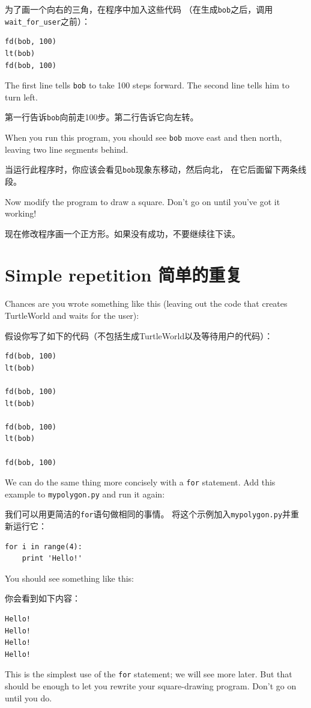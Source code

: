 \documentclass[10pt]{book}
\begin{document}
\begin{CJK}{UTF8}{gbsn}
为了画一个向右的三角，在程序中加入这些代码
（在生成{\tt bob}之后，调用\verb"wait_for_user"之前）：

\begin{verbatim}
fd(bob, 100)
lt(bob)
fd(bob, 100)
\end{verbatim}
%
The first line tells {\tt bob} to take 100 steps
forward.  The second line tells him to turn left.

第一行告诉{\tt bob}向前走100步。第二行告诉它向左转。

When you run this program, you should see {\tt bob} move east and then
north, leaving two line segments behind.

当运行此程序时，你应该会看见{\tt bob}现象东移动，然后向北，
在它后面留下两条线段。

Now modify the program to draw a square.  Don't go on until
you've got it working!

现在修改程序画一个正方形。如果没有成功，不要继续往下读。


\section{Simple repetition 简单的重复}
\label{repetition}

Chances are you wrote something like this (leaving out the code
that creates TurtleWorld and waits for the user):

假设你写了如下的代码（不包括生成TurtleWorld以及等待用户的代码）：

\begin{verbatim}
fd(bob, 100)
lt(bob)

fd(bob, 100)
lt(bob)

fd(bob, 100)
lt(bob)

fd(bob, 100)
\end{verbatim}
%
We can do the same thing more concisely with a {\tt for} statement.
Add this example to {\tt mypolygon.py} and run it again:

我们可以用更简洁的{\tt for}语句做相同的事情。
将这个示例加入{\tt mypolygon.py}并重新运行它：

\begin{verbatim}
for i in range(4):
    print 'Hello!'
\end{verbatim}
%
You should see something like this:

你会看到如下内容：

\begin{verbatim}
Hello!
Hello!
Hello!
Hello!
\end{verbatim}
%
This is the simplest use of the {\tt for} statement; we will see
more later.  But that should be enough to let you rewrite your
square-drawing program.  Don't go on until you do.


\end{CJK}
\end{document}
